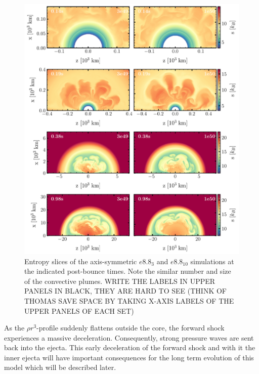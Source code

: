 \documentclass[fleqn,usenatbib]{mnras}
\newcommand{\NY}[2]{{\color{blue}\sout{#1}#2}}
\begin{document}
\begin{figure} %
 \includegraphics[scale =0.8 ]{pic/e8_sto_cuts_2d_1e50_3e49.pdf}
 \caption{Entropy slices of the axis-symmetric $e8.8_{3}$ and  $e8.8_{10}$ simulations at the indicated post-bounce times. Note the similar number and size of the convective plumes. \NY{}{WRITE THE LABELS IN UPPER PANELS IN BLACK, THEY ARE HARD TO SEE (THINK OF THOMAS\! SAVE SPACE BY TAKING X-AXIS LABELS OF THE UPPER PANELS OF EACH SET)}}\label{fig:e8 2d sto times}
\end{figure}


As the $\rho r^3$-profile suddenly flattens outside the core, the forward shock experiences a massive deceleration. Consequently, strong pressure waves are sent back into the ejecta. This early deceleration of the forward shock and with it the inner ejecta will have important consequences for the long term evolution of this model which will be described later.
\end{document}

